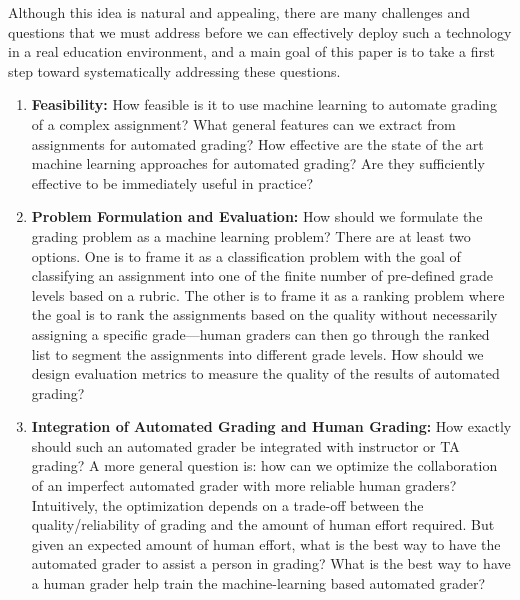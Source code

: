 Although this idea is natural and appealing, there are many challenges and
questions that we must address before we can effectively deploy such a
technology in a real education environment, and a main goal of this paper
is to take a first step toward systematically addressing these questions.

\begin{enumerate}
  \item {\bf Feasibility:} How feasible is it to use machine learning to
    automate grading of a complex assignment?  What general features can we
    extract from assignments for automated grading? How effective are the
    state of the art machine learning approaches for automated grading? Are
    they sufficiently effective to be immediately useful in practice?

  \item {\bf Problem Formulation and Evaluation:}  How should we formulate
    the grading problem as a machine learning problem? There are at least
    two options. One is to frame it as a classification problem with the
    goal of classifying an assignment into one of the finite number of
    pre-defined grade levels based on a rubric. The other is to frame it as
    a ranking problem where the goal is to rank the assignments based on
    the quality without necessarily assigning a specific grade---human
    graders can then go through the ranked list to segment the assignments
    into different grade levels. How should we design evaluation metrics to
    measure the quality of the results of automated grading?

  \item {\bf Integration of Automated Grading and Human Grading:} How
    exactly should such an automated grader be integrated with instructor
    or TA grading? A more general question is: how can we optimize the
    collaboration of an imperfect automated grader with more reliable human
    graders? Intuitively, the optimization depends on a trade-off between
    the quality/reliability of grading and the amount of human effort
    required. But given an expected amount of human effort, what is the
    best way to have the automated grader to assist a person in grading?
    What is the best way to have a human grader help train the
    machine-learning based automated grader?
\end{enumerate}

